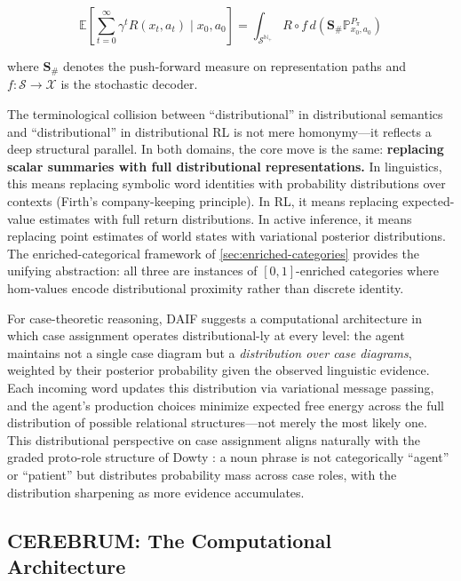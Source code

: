 \documentclass[
]{article}
\numberwithin{equation}{section}
\begin{document}
\[\mathbb{E}\left[\sum_{t=0}^{\infty} \gamma^t R(x_t, a_t) \mid x_0, a_0\right] = \int_{\mathcal{S}^{\mathbb{N}_+}} R \circ f \, d(\mathbf{S}_{\#} \mathbb{P}_{x_0, a_0}^{P_\pi}) \tag{7.1}\]

where \(\mathbf{S}_{\#}\) denotes the push-forward measure on
representation paths and \(f: \mathcal{S} \to \mathcal{X}\) is the
stochastic decoder.

The terminological collision between ``distributional'' in
distributional semantics and ``distributional'' in distributional RL is
not mere homonymy---it reflects a deep structural parallel. In both
domains, the core move is the same: \textbf{replacing scalar summaries
with full distributional representations.} In linguistics, this means
replacing symbolic word identities with probability distributions over
contexts (Firth's \citeyearpar{firth1957papers} company-keeping
principle). In RL, it means replacing expected-value estimates with full
return distributions. In active inference, it means replacing point
estimates of world states with variational posterior distributions. The
enriched-categorical framework of \autoref{sec:enriched-categories}
provides the unifying abstraction: all three are instances of
\([0,1]\)-enriched categories where hom-values encode distributional
proximity rather than discrete identity.

For case-theoretic reasoning, DAIF suggests a computational architecture
in which case assignment operates distributional-ly at every level: the
agent maintains not a single case diagram but a \emph{distribution over
case diagrams}, weighted by their posterior probability given the
observed linguistic evidence. Each incoming word updates this
distribution via variational message passing, and the agent's production
choices minimize expected free energy across the full distribution of
possible relational structures---not merely the most likely one. This
distributional perspective on case assignment aligns naturally with the
graded proto-role structure of Dowty \citeyearpar{dowty1991thematic}: a
noun phrase is not categorically ``agent'' or ``patient'' but
distributes probability mass across case roles, with the distribution
sharpening as more evidence accumulates.

\subsection{CEREBRUM: The Computational
Architecture}\label{cerebrum-the-computational-architecture}
\end{document}
